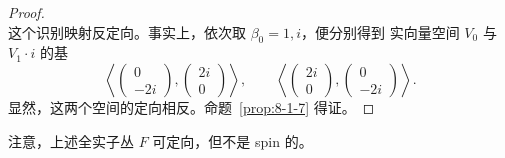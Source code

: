 \begin{proof}
\[\]
这个识别映射反定向。事实上，依次取 $\beta_0=1,i$，便分别得到
实向量空间 $V_0$ 与 $V_1\cdot i$ 的基
\[
 \left\langle
  \begin{pmatrix}0\\-2i\end{pmatrix},
  \begin{pmatrix}2i\\0\end{pmatrix}
 \right\rangle,
 \qquad
 \left\langle
  \begin{pmatrix}2i\\0\end{pmatrix},
  \begin{pmatrix}0\\-2i\end{pmatrix}
 \right\rangle.
\]
显然，这两个空间的定向相反。命题~\ref{prop:8-1-7} 得证。
\end{proof}

注意，上述全实子丛 $F$ 可定向，但不是 spin 的。
